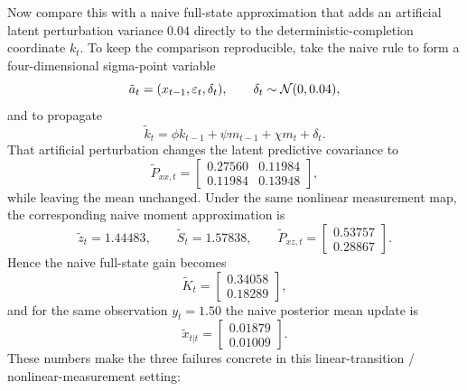 Now compare this with a naive full-state approximation that adds an artificial
latent perturbation variance $0.04$ directly to the deterministic-completion
coordinate $k_t$.  To keep the comparison reproducible, take the naive rule to
form a four-dimensional sigma-point variable
\[
  \tilde a_t=(x_{t-1},\varepsilon_t,\delta_t),
  \qquad
  \delta_t\sim\mathcal{N}(0,0.04),
\]
and to propagate
\[
  \tilde k_t
  =
  \phi k_{t-1}+\psi m_{t-1}+\chi m_t+\delta_t.
\]
That artificial perturbation changes the latent predictive covariance to
\[
  \tilde P_{xx,t}
  =
  \begin{bmatrix}
    0.27560 & 0.11984\\
    0.11984 & 0.13948
  \end{bmatrix},
\]
while leaving the mean unchanged.  Under the same nonlinear
measurement map, the corresponding naive moment approximation is
\[
  \tilde z_t = 1.44483,
  \qquad
  \tilde S_t = 1.57838,
  \qquad
  \tilde P_{xz,t}
  =
  \begin{bmatrix}
    0.53757\\ 0.28867
  \end{bmatrix}.
\]
Hence the naive full-state gain becomes
\[
  \tilde K_t
  =
  \begin{bmatrix}
    0.34058\\ 0.18289
  \end{bmatrix},
\]
and for the same observation $y_t=1.50$ the naive posterior mean update is
\[
  \tilde x_{t|t}
  =
  \begin{bmatrix}
    0.01879\\ 0.01009
  \end{bmatrix}.
\]
These numbers make the three failures concrete in this linear-transition /
nonlinear-measurement setting:
